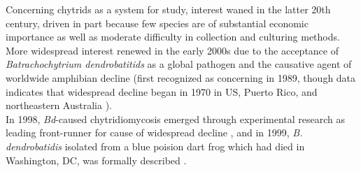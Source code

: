 \indent Concerning chytrids as a system for study, interest waned in the latter 20th century, driven in part because few species are of substantial economic importance \cite{James1999} as well as moderate difficulty in collection and culturing methods. More widespread interest renewed in the early 2000s due to the acceptance of \textit{Batrachochytrium dendrobatitids} as a global pathogen and the causative agent of worldwide amphibian decline (first recognized as concerning in 1989, though data indicates that widespread decline began in 1970 in US, Puerto Rico, and northeastern Australia \cite{Stuart2004}). \\
\indent In 1998, \textit{Bd}-caused chytridiomycosis emerged through experimental research as leading front-runner for cause of widespread decline \cite{Berger1998}, and in 1999, \textit{B. dendrobatidis} isolated from a blue poision dart frog which had died in Washington, DC, was formally described \cite{Longcore1999}. \\
